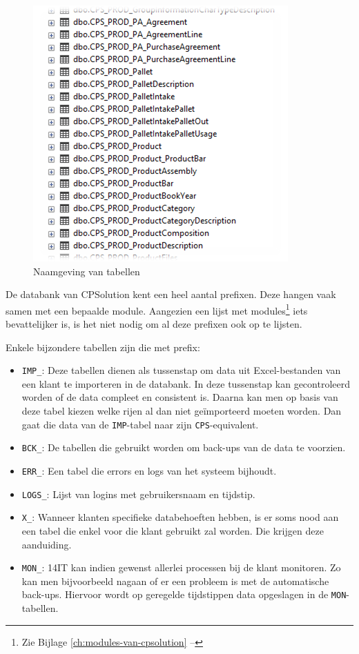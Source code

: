 \begin{figure}[H]
	\centering
	\includegraphics[width=0.45\linewidth]{img/cpsolution/naamgeving-tabellen.png}
	\caption{\label{fig:naamgeving-tabellen}Naamgeving van tabellen}
\end{figure}

De databank van CPSolution kent een heel aantal prefixen. Deze hangen vaak samen met een bepaalde module. Aangezien een lijst met modules\footnote{Zie Bijlage \ref{ch:modules-van-cpsolution} -- } iets bevattelijker is, is het niet nodig om al deze prefixen ook op te lijsten.

Enkele bijzondere tabellen zijn die met prefix:
\begin{itemize}
	\item \verb*|IMP_|: Deze tabellen dienen als tussenstap om data uit Excel-bestanden van een klant te importeren in de databank. In deze tussenstap kan gecontroleerd worden of de data compleet en consistent is. Daarna kan men op basis van deze tabel kiezen welke rijen al dan niet geïmporteerd moeten worden. Dan gaat die data van de \verb*|IMP|-tabel naar zijn \verb*|CPS|-equivalent.
	\item \verb*|BCK_|: De tabellen die gebruikt worden om back-ups van de data te voorzien.
	\item \verb*|ERR_|: Een tabel die errors en logs van het systeem bijhoudt.
	\item \verb*|LOGS_|: Lijst van logins met gebruikersnaam en tijdstip.
	\item \verb*|X_|: Wanneer klanten specifieke databehoeften hebben, is er soms nood aan een tabel die enkel voor die klant gebruikt zal worden. Die krijgen deze aanduiding.
	\item \verb*|MON_|: 14IT kan indien gewenst allerlei processen bij de klant monitoren. Zo kan men bijvoorbeeld nagaan of er een probleem is met de automatische back-ups. Hiervoor wordt op geregelde tijdstippen data opgeslagen in de \verb*|MON|-tabellen. 
\end{itemize}

